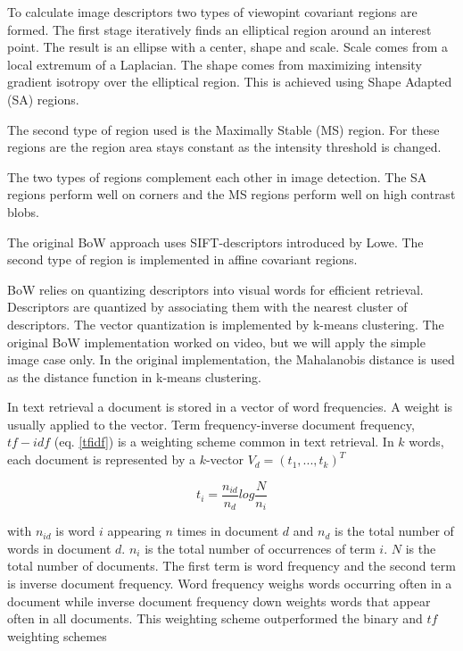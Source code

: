 \documentclass[english,12pt,a4paper,pdftex,elec,utf8]{aaltothesis}
\begin{document}
To calculate image descriptors two types of viewopint covariant regions are formed. The first stage iteratively finds an elliptical region around an interest point. The result is an ellipse with a center, shape and scale. Scale comes from a local extremum of a Laplacian. The shape comes from maximizing intensity gradient isotropy over the elliptical region. This is achieved using Shape Adapted (SA) regions.\cite{Sivic2003}

The second type of region used is the Maximally Stable (MS) region. For these regions are the region area stays constant as the intensity threshold is changed.

The two types of regions complement each other in image detection. The SA regions perform well on corners and the MS regions perform well on high contrast blobs. \cite{Sivic2003}

The original BoW approach uses SIFT-descriptors introduced by Lowe. The second type of region is implemented in affine covariant regions.

BoW relies on quantizing descriptors into visual words for efficient retrieval. Descriptors are quantized by associating them with the nearest cluster of descriptors. The vector quantization is implemented by k-means clustering. \cite{Sivic2003} The original BoW implementation worked on video, but we will apply the simple image case only. In the original implementation, the Mahalanobis distance is used as the distance function in k-means clustering.

In text retrieval a document is stored in a vector of word frequencies. A weight is usually applied to the vector. Term frequency-inverse document frequency, $tf-idf$ (eq. \ref{tfidf}) is a weighting scheme common in text retrieval. In $k$ words, each document is represented by a $k$-vector $V_{d}=(t_{1},...,t_{k})^{T}$

\begin{equation}\label{tfidf}
t_{i} = \frac{n_{id}}{n_{d}}log\frac{N}{n_{i}}
\end{equation}

with $n_{id}$ is word $i$ appearing $n$ times in document $d$ and $n_{d}$ is the total number of words in document $d$. $n_{i}$ is the total number of occurrences of term $i$. $N$ is the total number of documents. The first term is word frequency and the second term is inverse document frequency. Word frequency weighs words occurring often in a document while inverse document frequency down weights words that appear often in all documents. This weighting scheme outperformed the binary and $tf$ weighting schemes\cite{Sivic2003}
\end{document}
